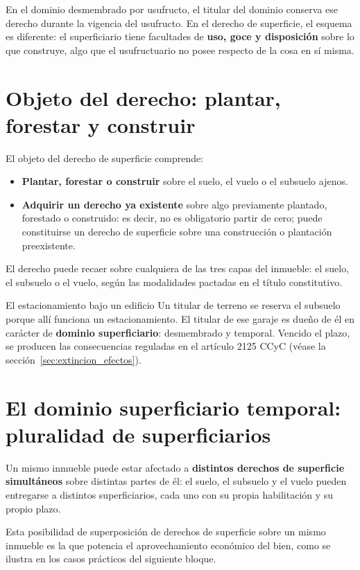 \documentclass[12pt,oneside]{book}
\begin{document}
En el dominio desmembrado por usufructo, el titular del dominio conserva ese derecho durante la vigencia del usufructo. En el derecho de superficie, el esquema es diferente: el superficiario tiene facultades de \textbf{uso, goce y disposición} sobre lo que construye, algo que el usufructuario no posee respecto de la cosa en sí misma.

\section{Objeto del derecho: plantar, forestar y construir}

El objeto del derecho de superficie comprende:

\begin{itemize}
    \item \textbf{Plantar, forestar o construir} sobre el suelo, el vuelo o el subsuelo ajenos.
    \item \textbf{Adquirir un derecho ya existente} sobre algo previamente plantado, forestado o construido: es decir, no es obligatorio partir de cero; puede constituirse un derecho de superficie sobre una construcción o plantación preexistente.
\end{itemize}

El derecho puede recaer sobre cualquiera de las tres capas del inmueble: el suelo, el subsuelo o el vuelo, según las modalidades pactadas en el título constitutivo.

\begin{example}{El estacionamiento bajo un edificio}
Un titular de terreno se reserva el subsuelo porque allí funciona un estacionamiento. El titular de ese garaje es dueño de él en carácter de \textbf{dominio superficiario}: desmembrado y temporal. Vencido el plazo, se producen las consecuencias reguladas en el artículo 2125 CCyC (véase la sección~\ref{sec:extincion_efectos}).
\end{example}

\section{El dominio superficiario temporal: pluralidad de superficiarios}

Un mismo inmueble puede estar afectado a \textbf{distintos derechos de superficie simultáneos} sobre distintas partes de él: el suelo, el subsuelo y el vuelo pueden entregarse a distintos superficiarios, cada uno con su propia habilitación y su propio plazo.

Esta posibilidad de superposición de derechos de superficie sobre un mismo inmueble es la que potencia el aprovechamiento económico del bien, como se ilustra en los casos prácticos del siguiente bloque.
\end{document}
